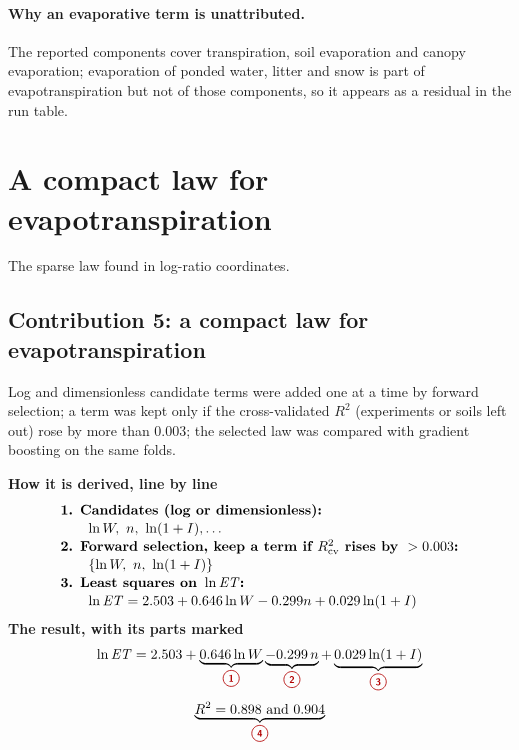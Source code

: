 \paragraph{Why an evaporative term is unattributed.} The reported components cover transpiration, soil evaporation and canopy evaporation; evaporation of ponded water, litter and snow is part of evapotranspiration but not of those components, so it appears as a residual in the run table.

\section{A compact law for evapotranspiration}
The sparse law found in log-ratio coordinates.

\subsection{Contribution 5: a compact law for evapotranspiration}\label{con:s1:5}
\begin{derivation}
Log and dimensionless candidate terms were added one at a time by forward selection; a term was kept only if the cross-validated $R^2$ (experiments or soils left out) rose by more than 0.003; the selected law was compared with gradient boosting on the same folds.
\end{derivation}
\begin{keyresult}
\begin{pencil}
{\small\noindent\textbf{How it is derived, line by line}
\[\begin{array}{@{}l@{}}\textbf{1. Candidates (log or dimensionless):}\\[1pt]
\qquad \ln W,\ n,\ \ln(1+I),\dots\\[1pt]
\textbf{2. Forward selection, keep a term if } R^2_{\mathrm{cv}}\textbf{ rises by }>0.003\textbf{:}\\[1pt]
\qquad \{\ln W,\ n,\ \ln(1+I)\}\\[1pt]
\textbf{3. Least squares on } \ln\ET\textbf{:}\\[1pt]
\qquad \ln\ET=2.503+0.646\ln W-0.299n+0.029\ln(1+I)
\end{array}\]}
\noindent\textbf{The result, with its parts marked}
\[\ln\ET=2.503+\underbrace{0.646\ln W}_{\circled{1}}\underbrace{-0.299\,n}_{\circled{2}}+\underbrace{0.029\ln(1+I)}_{\circled{3}}\]
\[\underbrace{R^2=0.898\ \text{and}\ 0.904}_{\circled{4}}\]
\end{pencil}
\end{keyresult}
